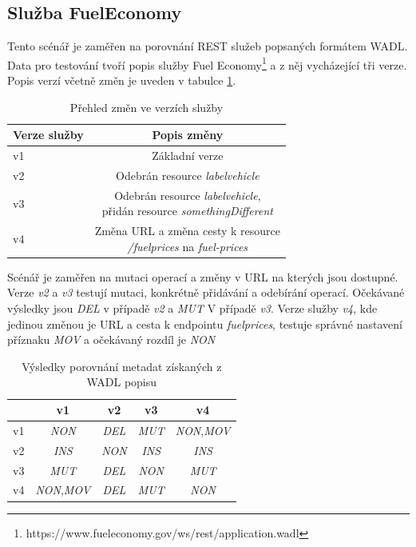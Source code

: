 \documentclass[czech,DP]{thesiskiv}
\begin{document}
\subsection{Služba FuelEconomy}

Tento scénář je zaměřen na porovnání REST služeb popsaných formátem WADL. Data pro testování tvoří popis služby Fuel Economy\footnote{https://www.fueleconomy.gov/ws/rest/application.wadl} a z něj vycházející tři verze. Popis verzí včetně změn je uveden v tabulce \ref{tab:wadl-diffs}.

\begin{table}[h]
	\centering
	\begin{tabular}{|l|c|}
		\hline
		Verze služby & Popis změny \\
		\hline
		\hline
		v1 & Základní verze \\
		\hline
		v2 & Odebrán resource \textit{labelvehicle} \\
		\hline
		v3 & \makecell{Odebrán resource \textit{labelvehicle}, \\ přidán resource \textit{somethingDifferent}} \\
		\hline
		v4 & \makecell{Změna URL a změna cesty k resource \\ \textit{/fuelprices} na \textit{fuel-prices}}  \\
		\hline
	\end{tabular}
	\caption{Přehled změn ve verzích služby}
	\label{tab:wadl-diffs}
\end{table}

Scénář je zaměřen na mutaci operací a změny v URL na kterých jsou dostupné. Verze \textit{v2} a \textit{v3} testují mutaci, konkrétně přidávání a odebírání operací. Očekávané výsledky jsou \textit{DEL} v případě \textit{v2} a \textit{MUT} V případě \textit{v3}. Verze služby \textit{v4}, kde jedinou změnou je URL a cesta k endpointu \textit{fuelprices}, testuje správné nastavení příznaku \textit{MOV} a očekávaný rozdíl je \textit{NON}

\begin{table}[h]
	\centering
	\begin{tabular}{|l||c|c|c|c|}
		\hline
		& v1 & v2 & v3 & v4 \\
		\hline
		\hline
		v1 & \textit{NON} & \textit{DEL} & \textit{MUT} & \textit{NON},\textit{MOV} \\
		\hline
		v2 & \textit{INS} & \textit{NON} & \textit{INS} & \textit{INS} \\
		\hline
		v3 & \textit{MUT} & \textit{DEL} & \textit{NON} & \textit{MUT} \\
		\hline
		v4 & \textit{NON},\textit{MOV} & \textit{DEL} & \textit{MUT} & \textit{NON} \\
		\hline
	\end{tabular}
	\caption{Výsledky porovnání metadat získaných z WADL popisu}
	\label{tab:wadl-cmp-res}
\end{table} 
\end{document}
